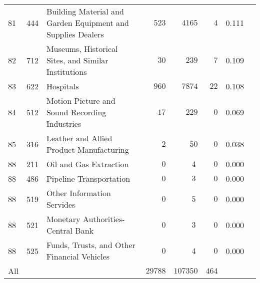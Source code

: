 \documentclass[9pt, oneside]{article}   	%
\begin{document}
\begin{longtable}{lcp{3 in}ccccc}
81  & 444 & Building Material and Garden Equipment and Supplies Dealers & $\phantom{00}523$ & $\phantom{00}4165$ & $\phantom{00}4$ & 0.111 \\
82  & 712 & Museums, Historical Sites, and Similar Institutions & $\phantom{000}30$ & $\phantom{000}239$ & $\phantom{00}7$ & 0.109 \\
83  & 622 & Hospitals & $\phantom{00}960$ & $\phantom{00}7874$ & $\phantom{0}22$ & 0.108 \\
84  & 512 & Motion Picture and Sound Recording Industries & $\phantom{000}17$ & $\phantom{000}229$ & $\phantom{00}0$ & 0.069 \\
85  & 316 & Leather and Allied Product Manufacturing & $\phantom{0000}2$ & $\phantom{0000}50$ & $\phantom{00}0$ & 0.038 \\
88  & 211 & Oil and Gas Extraction & $\phantom{0000}0$ & $\phantom{0000}4$ & $\phantom{00}0$ & 0.000 \\
88  & 486 & Pipeline Transportation & $\phantom{0000}0$ & $\phantom{0000}3$ & $\phantom{00}0$ & 0.000 \\
88  & 519 & Other Information Servides & $\phantom{0000}0$ & $\phantom{0000}5$ & $\phantom{00}0$ & 0.000 \\
88  & 521 & Monetary Authorities-Central Bank & $\phantom{0000}0$ & $\phantom{0000}3$ & $\phantom{00}0$ & 0.000 \\
88  & 525& Funds, Trusts, and Other Financial Vehicles & $\phantom{0000}0$ & $\phantom{0000}4$ & $\phantom{00}0$ & 0.000 \\
\cline{1-1} \cline{2-2} \cline{3-3} \cline{4-4} \cline{5-5} \cline{6-6} \cline{7-7} \cline{8-8} %
All  &  & & $29788$ & $107350$ &  $464$ & \\
\hline 
\end{longtable}

\pagebreak

\end{document}
